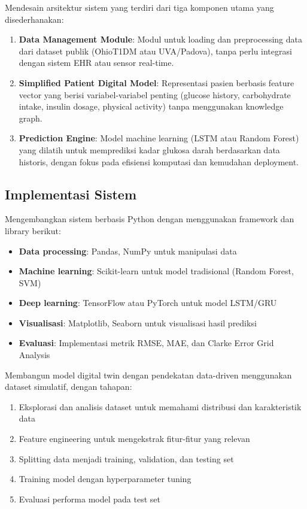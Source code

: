 \documentclass[12pt,a4paper,oneside]{book}
\begin{document}
Mendesain arsitektur sistem yang terdiri dari tiga komponen utama yang disederhanakan:

\begin{enumerate}
    \item \textbf{Data Management Module}: Modul untuk loading dan preprocessing data dari dataset publik (OhioT1DM atau UVA/Padova), tanpa perlu integrasi dengan sistem EHR atau sensor real-time.
    
    \item \textbf{Simplified Patient Digital Model}: Representasi pasien berbasis feature vector yang berisi variabel-variabel penting (glucose history, carbohydrate intake, insulin dosage, physical activity) tanpa menggunakan knowledge graph.
    
    \item \textbf{Prediction Engine}: Model machine learning (LSTM atau Random Forest) yang dilatih untuk memprediksi kadar glukosa darah berdasarkan data historis, dengan fokus pada efisiensi komputasi dan kemudahan deployment.
\end{enumerate}

\subsection{Implementasi Sistem}

Mengembangkan sistem berbasis Python dengan menggunakan framework dan library berikut:

\begin{itemize}
    \item \textbf{Data processing}: Pandas, NumPy untuk manipulasi data
    \item \textbf{Machine learning}: Scikit-learn untuk model tradisional (Random Forest, SVM)
    \item \textbf{Deep learning}: TensorFlow atau PyTorch untuk model LSTM/GRU
    \item \textbf{Visualisasi}: Matplotlib, Seaborn untuk visualisasi hasil prediksi
    \item \textbf{Evaluasi}: Implementasi metrik RMSE, MAE, dan Clarke Error Grid Analysis
\end{itemize}

Membangun model digital twin dengan pendekatan data-driven menggunakan dataset simulatif, dengan tahapan:

\begin{enumerate}
    \item Eksplorasi dan analisis dataset untuk memahami distribusi dan karakteristik data
    \item Feature engineering untuk mengekstrak fitur-fitur yang relevan
    \item Splitting data menjadi training, validation, dan testing set
    \item Training model dengan hyperparameter tuning
    \item Evaluasi performa model pada test set
\end{enumerate}
\end{document}
